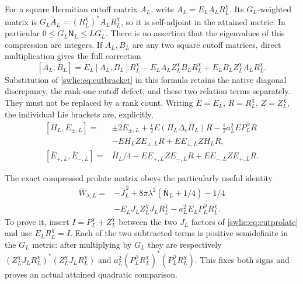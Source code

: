 \documentclass[11pt]{article}
\begin{document}
For a square Hermitian cutoff matrix $A_L$, write
$\overline A_L=E_LA_LR_L^\chi$. Its $G_L$-weighted
matrix is
$G_L\overline A_L=(R_L^\chi)^*A_LR_L^\chi$, so it is
self-adjoint in the attained metric. In particular
$0\leq G_L\overline{\mathsf N}_L\leq L G_L$.
There is no assertion that the eigenvalues of this
compression are integers.
If $A_L,B_L$ are any two square cutoff matrices,
direct multiplication gives the full correction
\begin{equation}\label{swlie:eq:compressedbracket}
 [\overline A_L,\overline B_L]
  =E_L[A_L,B_L]R_L^\chi
    -E_LA_LZ_L^\chi B_LR_L^\chi
    +E_LB_LZ_L^\chi A_LR_L^\chi.
\end{equation}
Substitution of \eqref{swlie:eq:cutbracket} in this formula
retains the native diagonal discrepancy, the rank-one
cutoff defect, and these two relation terms separately.
They must not be replaced by a rank count.
Writing $E=E_L$, $R=R_L^\chi$, $Z=Z_L^\chi$,
the individual Lie brackets are, explicitly,
\begin{equation}\label{swlie:eq:quotientlie}
 \begin{aligned}
 [\overline H_L,\overline E_{\pm,L}]
 ={}&\pm2\overline E_{\pm,L}
   +\tfrac i2E(\Pi_L\Delta_c\Pi_L)R
   -\tfrac i2a_L^2EP_L^\partial R\\
 &-EH_LZE_{\pm,L}R+EE_{\pm,L}ZH_LR,\\
 [\overline E_{+,L},\overline E_{-,L}]
 ={}&\overline H_L/4
       -EE_{+,L}ZE_{-,L}R+EE_{-,L}ZE_{+,L}R .
 \end{aligned}
\end{equation}

The exact compressed prolate matrix obeys the particularly
useful identity
\begin{equation}\label{swlie:eq:compressedprolate}
 \begin{split}
 \overline W_{\lambda,L}
 ={}&-\overline J_L^{\,2}
       +8\pi\lambda^2(\overline{\mathsf N}_L+1/4)-1/4\\
 &-E_LJ_LZ_L^\chi J_LR_L^\chi
       -a_L^2E_LP_L^\partial R_L^\chi .
 \end{split}
\end{equation}
To prove it, insert $I=P_L^\chi+Z_L^\chi$
between the two $J_L$ factors of \eqref{swlie:eq:cutprolate}
and use $E_LR_L^\chi=I$.
Each of the two subtracted terms is positive
semidefinite in the $G_L$ metric: after multiplying
by $G_L$ they are respectively
$(Z_L^\chi J_LR_L^\chi)^*(Z_L^\chi J_LR_L^\chi)$
and $a_L^2(P_L^\partial R_L^\chi)^*
                           (P_L^\partial R_L^\chi)$.
This fixes both signs and proves an actual attained
quadratic comparison.
\end{document}
